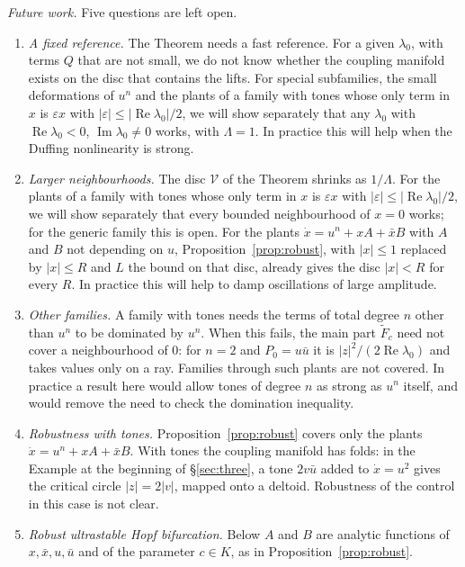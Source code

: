 \documentclass[11pt,reqno]{amsart}
\theoremstyle{plain}
\theoremstyle{definition}
\theoremstyle{remark}
\begin{document}
\medskip
\emph{Future work.} Five questions are left open.
\begin{enumerate}
\item \emph{A fixed reference.} The Theorem needs a fast reference. For a given $\lambda_0$, with terms $Q$ that are not small, we do not know whether the coupling manifold exists on the disc that contains the lifts. For special subfamilies, the small deformations of $u^{n}$ and the plants of a family with tones whose only term in $x$ is $\varepsilon x$ with $|\varepsilon|\le|\operatorname{Re}\lambda_0|/2$, we will show separately that any $\lambda_0$ with $\operatorname{Re}\lambda_0<0$, $\operatorname{Im}\lambda_0\ne0$ works, with $\Lambda=1$. In practice this will help when the Duffing nonlinearity is strong.
\item \emph{Larger neighbourhoods.} The disc $\mathcal V$ of the Theorem shrinks as $1/\Lambda$. For the plants of a family with tones whose only term in $x$ is $\varepsilon x$ with $|\varepsilon|\le|\operatorname{Re}\lambda_0|/2$, we will show separately that every bounded neighbourhood of $x=0$ works; for the generic family this is open. For the plants $\dot x=u^{n}+xA+\bar xB$ with $A$ and $B$ not depending on $u$, Proposition~\ref{prop:robust}, with $|x|\le1$ replaced by $|x|\le R$ and $L$ the bound on that disc, already gives the disc $|x|<R$ for every $R$. In practice this will help to damp oscillations of large amplitude.
\item \emph{Other families.} A family with tones needs the terms of total degree $n$ other than $u^{n}$ to be dominated by $u^{n}$. When this fails, the main part $\tilde F_c$ need not cover a neighbourhood of $0$: for $n=2$ and $P_0=u\bar u$ it is $|z|^{2}/(2\operatorname{Re}\lambda_0)$ and takes values only on a ray. Families through such plants are not covered. In practice a result here would allow tones of degree $n$ as strong as $u^{n}$ itself, and would remove the need to check the domination inequality.
\item \emph{Robustness with tones.} Proposition~\ref{prop:robust} covers only the plants $\dot x=u^{n}+xA+\bar xB$. With tones the coupling manifold has folds: in the Example at the beginning of \S\ref{sec:three}, a tone $2v\bar u$ added to $\dot x=u^{2}$ gives the critical circle $|z|=2|v|$, mapped onto a deltoid. Robustness of the control in this case is not clear.
\item \emph{Robust ultrastable Hopf bifurcation.} Below $A$ and $B$ are analytic functions of $x,\bar x,u,\bar u$ and of the parameter $c\in K$, as in Proposition~\ref{prop:robust}.


\end{enumerate}
\end{document}
